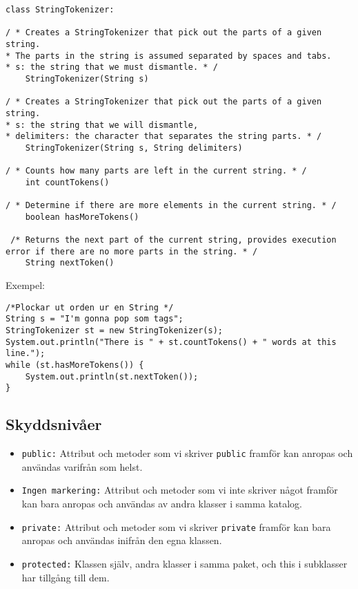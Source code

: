 \documentclass[11pt]{article}
\begin{document}
\begin{lstlisting}
class StringTokenizer:

/ * Creates a StringTokenizer that pick out the parts of a given string. 
* The parts in the string is assumed separated by spaces and tabs. 
* s: the string that we must dismantle. * /
	StringTokenizer(String s)

/ * Creates a StringTokenizer that pick out the parts of a given string. 
* s: the string that we will dismantle, 
* delimiters: the character that separates the string parts. * /
	StringTokenizer(String s, String delimiters)

/ * Counts how many parts are left in the current string. * /
	int countTokens()
	
/ * Determine if there are more elements in the current string. * /
	boolean hasMoreTokens()
	
 /* Returns the next part of the current string, provides execution error if there are no more parts in the string. * /
	String nextToken()
\end{lstlisting} 
Exempel:
\begin{lstlisting}
/*Plockar ut orden ur en String */
String s = "I'm gonna pop som tags";
StringTokenizer st = new StringTokenizer(s);
System.out.println("There is " + st.countTokens() + " words at this line.");
while (st.hasMoreTokens()) {
	System.out.println(st.nextToken());
}
\end{lstlisting} 

\subsection{Skyddsnivåer}
\begin{itemize}
\item{ \verb+public:+ Attribut och metoder som vi skriver \verb+public+ framför kan anropas och användas varifrån som helst. }
\item{ \verb+Ingen markering:+ Attribut och metoder som vi inte skriver något framför kan bara anropas och användas av andra klasser i samma katalog. }
\item{ \verb+private:+ Attribut och metoder som vi skriver \verb+private+ framför kan bara anropas och användas inifrån den egna klassen. }
\item{ \verb+protected:+ Klassen själv, andra klasser i samma paket, och this i subklasser har tillgång till dem.}
\end{itemize}
\end{document}

